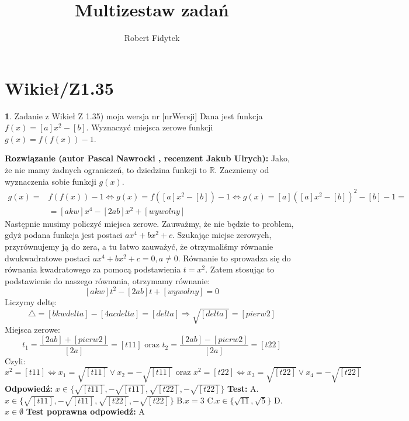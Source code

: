 \documentclass[12pt, a4paper]{article}
\title{Multizestaw zadań}
\author{Robert Fidytek}
\date{}
\theoremstyle{definition} %
\newtheorem{zad}{}
\newcommand{\kategoria}[1]{\section{#1}} %
\newcommand{\zadStart}[1]{\begin{zad}#1\newline} %
\newcommand{\zadStop}{\end{zad}}   %
\newcommand{\rozwStart}[2]{\noindent \textbf{Rozwiązanie (autor #1 , recenzent #2): }\newline} %
\newcommand{\rozwStop}{\newline}                                            %
\newcommand{\odpStart}{\noindent \textbf{Odpowiedź:}\newline}    %
\newcommand{\odpStop}{\newline}                                             %
\newcommand{\testStart}{\noindent \textbf{Test:}\newline} %
\newcommand{\testStop}{\newline} %
\newcommand{\kluczStart}{\noindent \textbf{Test poprawna odpowiedź:}\newline} %
\newcommand{\kluczStop}{\newline} %
\begin{document}
\maketitle


\kategoria{Wikieł/Z1.35}
\zadStart{Zadanie z Wikieł Z 1.35) moja wersja nr [nrWersji]}
Dana jest funkcja $f(x)=[a]x^2-[b]$.
Wyznaczyć miejsca zerowe funkcji \mbox{$g(x)=f(f(x))-1$}.
\zadStop
\rozwStart{Pascal Nawrocki}{Jakub Ulrych}
Jako, że nie mamy żadnych ograniczeń, to dziedzina funkcji to $\mathbb{R}$.
Zaczniemy od wyznaczenia sobie funkcji $g(x)$.
\begin{equation}
\begin{split}
g(x)=&f(f(x))-1 \Leftrightarrow g(x)=f([a]x^2-[b])-1 \Leftrightarrow g(x)=[a]([a]x^2-[b])^2-[b]-1=\\&=[akw]x^4-[2ab]x^2+[wywolny]
\end{split}
\end{equation}
Następnie musimy policzyć miejsca zerowe. Zauważmy, że nie będzie to problem, gdyż podana funkcja jest postaci $ax^4+bx^2+c$. Szukając miejsc zerowych, przyrównujemy ją do zera, a tu łatwo zauważyć, że otrzymaliśmy równanie dwukwadratowe postaci $ax^4+bx^2+c=0, a\neq0$. Równanie to sprowadza się do równania kwadratowego za pomocą podstawienia $t=x^2$. Zatem stosując to podstawienie do naszego równania, otrzymamy równanie:
$$[akw]t^2-[2ab]t+[wywolny]=0$$
Liczymy deltę:
$$\bigtriangleup=[bkwdelta]-[4acdelta]=[delta]\Rightarrow\sqrt{[delta]}=[pierw2]$$
Miejsca zerowe:
$$t_1=\frac{[2ab]+[pierw2]}{[2a]}=[t11] \text{ oraz } t_2=\frac{[2ab]-[pierw2]}{[2a]}=[t22]$$
Czyli:
$$x^2={[t11]}\Leftrightarrow x_1=\sqrt{[t11]} \vee x_2=-\sqrt{[t11]} \text{ oraz } x^2=[t22]\Leftrightarrow x_3=\sqrt{[t22]} \vee x_4=-\sqrt{[t22]}$$
\rozwStop
\odpStart
$x\in\{\sqrt{[t11]},-\sqrt{[t11]},\sqrt{[t22]},-\sqrt{[t22]}\}$
\odpStop
\testStart
A.$x\in\{\sqrt{[t11]},-\sqrt{[t11]},\sqrt{[t22]},-\sqrt{[t22]}\}$
B.$x=3$
C.$x\in\{\sqrt{11},\sqrt{5}\}$
D.$x\in \emptyset$
\testStop
\kluczStart
A
\kluczStop
\end{document}
